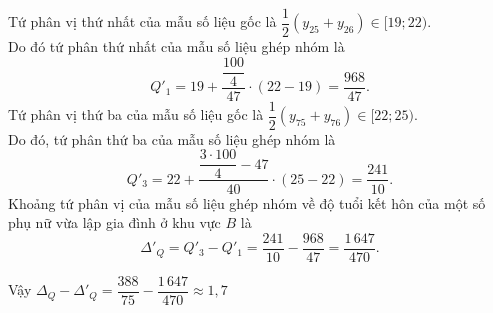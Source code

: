 \begin{bt}
{\begin{itemize}
			Tứ phân vị thứ nhất của mẫu số liệu gốc là $\dfrac{1}{2}(y_{25}+y_{26})\in [19;22)$.\\
			Do đó tứ phân thứ nhất của mẫu số liệu ghép nhóm là
			$$Q'_1=19+\dfrac{\dfrac{100}{4}}{47}\cdot (22-19)=\dfrac{968}{47}.$$
			Tứ phân vị thứ ba của mẫu số liệu gốc là $\dfrac{1}{2}(y_{75}+y_{76})\in [22;25)$.\\
			Do đó, tứ phân thứ ba của mẫu số liệu ghép nhóm là
			$$Q'_3=22+\dfrac{\dfrac{3\cdot 100}{4}-47}{40}\cdot (25-22)=\dfrac{241}{10}.$$
			Khoảng tứ phân vị của mẫu số liệu ghép nhóm về độ tuổi kết hôn của một số phụ nữ vừa lập gia đình ở khu vực $B$ là
			$$\Delta'_Q=Q'_3-Q'_1=\dfrac{241}{10}-\dfrac{968}{47}=\dfrac{1\,647}{470}.$$
		\end{itemize}
		Vậy $\Delta_Q-\Delta'_Q=\dfrac{388}{75}-\dfrac{1\,647}{470}\approx 1{,}7$
	}
\end{bt}

